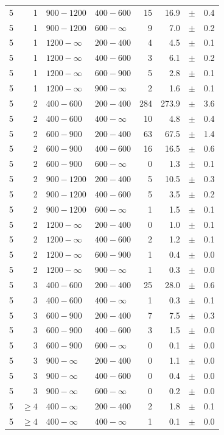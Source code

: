 \begin{table}[!h]
\begin{tabular}{rrllrrcl}
5 & 1 & $ 900-1200$ & $400-600$ &     15 &     16.9 &$\pm$&    0.4 \\
5 & 1 & $ 900-1200$ & $600-\infty$ &      9 &      7.0 &$\pm$&    0.2 \\
5\T & 1 & $1200- \infty$ & $200-400$ &      4 &      4.5 &$\pm$&    0.1 \\
5 & 1 & $1200- \infty$ & $400-600$ &      3 &      6.1 &$\pm$&    0.2 \\
5 & 1 & $1200- \infty$ & $600-900$ &      5 &      2.8 &$\pm$&    0.1 \\
5 & 1 & $1200- \infty$ & $900-\infty$ &      2 &      1.6 &$\pm$&    0.1 \\
5\T & 2 & $ 400- 600$ & $200-400$ &    284 &    273.9 &$\pm$&    3.6 \\
5 & 2 & $ 400- 600$ & $400-\infty$ &     10 &      4.8 &$\pm$&    0.4 \\
5\T & 2 & $ 600- 900$ & $200-400$ &     63 &     67.5 &$\pm$&    1.4 \\
5 & 2 & $ 600- 900$ & $400-600$ &     16 &     16.5 &$\pm$&    0.6 \\
5 & 2 & $ 600- 900$ & $600-\infty$ &      0 &      1.3 &$\pm$&    0.1 \\
5\T & 2 & $ 900-1200$ & $200-400$ &      5 &     10.5 &$\pm$&    0.3 \\
5 & 2 & $ 900-1200$ & $400-600$ &      5 &      3.5 &$\pm$&    0.2 \\
5 & 2 & $ 900-1200$ & $600-\infty$ &      1 &      1.5 &$\pm$&    0.1 \\
5\T & 2 & $1200- \infty$ & $200-400$ &      0 &      1.0 &$\pm$&    0.1 \\
5 & 2 & $1200- \infty$ & $400-600$ &      2 &      1.2 &$\pm$&    0.1 \\
5 & 2 & $1200- \infty$ & $600-900$ &      1 &      0.4 &$\pm$&    0.0 \\
5 & 2 & $1200- \infty$ & $900-\infty$ &      1 &      0.3 &$\pm$&    0.0 \\
5\T & 3 & $ 400- 600$ & $200-400$ &     25 &     28.0 &$\pm$&    0.6 \\
5 & 3 & $ 400- 600$ & $400-\infty$ &      1 &      0.3 &$\pm$&    0.1 \\
5\T & 3 & $ 600- 900$ & $200-400$ &      7 &      7.5 &$\pm$&    0.3 \\
5 & 3 & $ 600- 900$ & $400-600$ &      3 &      1.5 &$\pm$&    0.0 \\
5 & 3 & $ 600- 900$ & $600-\infty$ &      0 &      0.1 &$\pm$&    0.0 \\
5\T & 3 & $ 900- \infty$ & $200-400$ &      0 &      1.1 &$\pm$&    0.0 \\
5 & 3 & $ 900- \infty$ & $400-600$ &      0 &      0.4 &$\pm$&    0.0 \\
5 & 3 & $ 900- \infty$ & $600-\infty$ &      0 &      0.2 &$\pm$&    0.0 \\
5\T & $\geq 4$ & $ 400- \infty$ & $200-400$ &      2 &      1.8 &$\pm$&    0.1 \\
5 & $\geq 4$ & $ 400- \infty$ & $400-\infty$ &      1 &      0.1 &$\pm$&    0.0 \\
    \hline
  \end{tabular}
\end{table}

